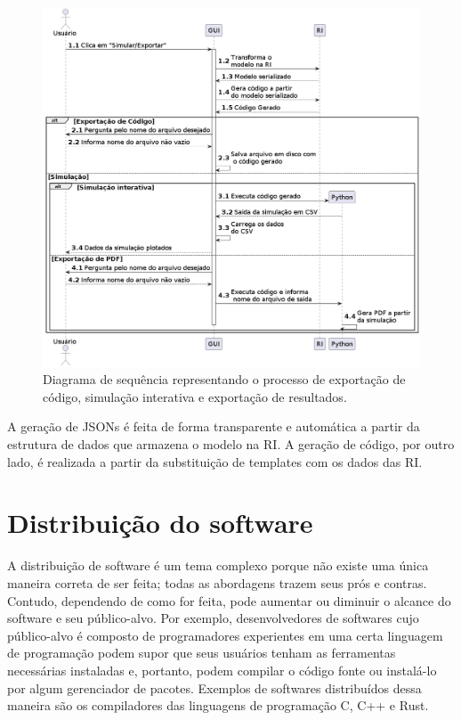 \documentclass[
	12pt,				%
	openright,			%
	oneside,			%
	a4paper,			%
	main=brazil,
	english,			%
	]{ufsj-abntex2}
\begin{document}
\begin{figure}[h]
    \centering
    \includegraphics[scale=0.42]{diagrams/img/gui-ri.png} 
    \caption{Diagrama de sequência representando o processo de exportação de código, simulação interativa e exportação de resultados.}
    \label{fig:gui-ri}
\end{figure}

A geração de JSONs é feita de forma transparente e automática a partir da estrutura de dados que armazena o modelo na RI. A geração de código, por outro lado, é realizada a partir da substituição de templates com os dados das RI.

\section{Distribuição do software}
\label{sec:distribuicao}

A distribuição de software é um tema complexo porque não existe uma única maneira correta de ser feita; todas as abordagens trazem seus prós e contras. Contudo, dependendo de como for feita, pode aumentar ou diminuir o alcance do software e seu público-alvo. Por exemplo, desenvolvedores de softwares cujo público-alvo é composto de programadores experientes em uma certa linguagem de programação podem supor que seus usuários tenham as ferramentas necessárias instaladas e, portanto, podem compilar o código fonte ou instalá-lo por algum gerenciador de pacotes. Exemplos de softwares distribuídos dessa maneira são os compiladores das linguagens de programação C, C++ e Rust.
\end{document}
